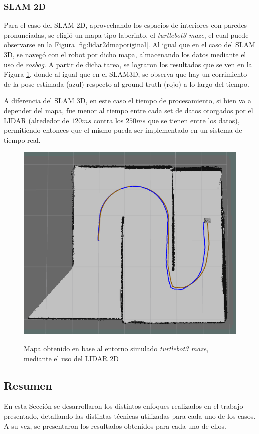\subsubsection{SLAM 2D}
Para el caso del SLAM 2D, aprovechando los espacios de interiores con paredes pronunciadas, se eligió un mapa tipo laberinto, el \textit{turtlebot3 maze}, el cual puede observarse en la Figura \ref{fig:lidar2dmaporiginal}. Al igual que en el caso del SLAM 3D, se navegó con el robot por dicho mapa, almacenando los datos mediante el uso de \textit{rosbag}. A partir de dicha tarea, se lograron los resultados que se ven en la Figura \ref{fig:lidar2dmapgenerated}, donde al igual que en el SLAM3D, se observa que hay un corrimiento de la pose estimada (azul) respecto al ground truth (rojo) a lo largo del tiempo.

A diferencia del SLAM 3D, en este caso el tiempo de procesamiento, si bien va a depender del mapa, fue menor al tiempo entre cada set de datos otorgados por el LIDAR (alrededor de $120ms$ contra los $250ms$ que se tienen entre los datos), permitiendo entonces que el mismo pueda ser implementado en un sistema de tiempo real.


\begin{figure}[!ht]
    \centering
    {\includegraphics[width=0.9\linewidth]{Img/LIDAR2DMapGenerated.png}}
    \caption{Mapa obtenido en base al entorno simulado \textit{turtlebot3 maze}, mediante el uso del LIDAR 2D}
    \label{fig:lidar2dmapgenerated}
\end{figure}

\subsection{Resumen}
En esta Sección se desarrollaron los distintos enfoques realizados en el trabajo presentado, detallando las distintas técnicas utilizadas para cada uno de los casos. A su vez, se presentaron los resultados obtenidos para cada uno de ellos.
